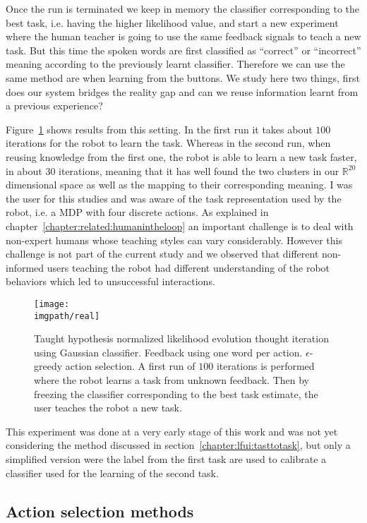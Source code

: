 Once the run is terminated we keep in memory the classifier corresponding to the best task, i.e. having the higher likelihood value, and start a new experiment where the human teacher is going to use the same feedback signals to teach a new task. But this time the spoken words are first classified as ``correct'' or ``incorrect'' meaning according to the previously learnt classifier. Therefore we can use the same method are when learning from the buttons. We study here two things, first does our system bridges the reality gap and can we reuse information learnt from a previous experience? 

Figure~\ref{fig:Real} shows results from this setting. In the first run it takes about $100$ iterations for the robot to learn the task. Whereas in the second run, when reusing knowledge from the first one, the robot is able to learn a new task faster, in about $30$ iterations, meaning that it has well found the two clusters in our $\mathbb{R}^{20}$ dimensional space as well as the mapping to their corresponding meaning. I was the user for this studies and was aware of the task representation used by the robot, i.e. a MDP with four discrete actions. As explained in chapter~\ref{chapter:related:humanintheloop} an important challenge is to deal with non-expert humans whose teaching styles can vary considerably. However this challenge is not part of the current study and we observed that different non-informed users teaching the robot had different understanding of the robot behaviors which led to unsuccessful interactions.

\begin{figure}[!ht]
  \centering
  \texttt{[image: \\imgpath/real]}
  \caption{Taught hypothesis normalized likelihood evolution thought iteration using Gaussian classifier.  Feedback using one word per action. $\epsilon$-greedy action selection. A first run of $100$ iterations is performed where the robot learns a task from unknown feedback. Then by freezing the classifier corresponding to the best task estimate, the user teaches the robot a new task.}
  \label{fig:Real}
\end{figure}

This experiment was done at a very early stage of this work and was not yet considering the method discussed in section~\ref{chapter:lfui:tasttotask}, but only a simplified version were the label from the first task are used to calibrate a classifier used for the learning of the second task.

\subsection{Action selection methods}

